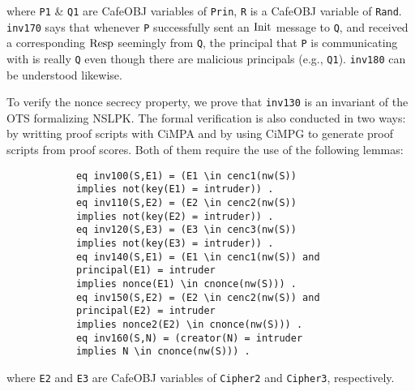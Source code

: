 \documentclass[10pt, conference, compsocconf]{IEEEtran}
\begin{document}
	\noindent
	where \verb!P1! \& \verb!Q1! are CafeOBJ variables of \verb!Prin!, \verb!R! is a CafeOBJ variable of \verb!Rand!.
	\verb!inv170! says that whenever \verb!P! successfully sent an $\rm Init$ message to \verb!Q!, and
	received a corresponding $\rm Resp$ seemingly from \verb!Q!,
	the principal that \verb!P! is communicating with is really \verb!Q! even though there are malicious principals (e.g., \verb!Q1!).
	\verb!inv180! can be understood likewise.
	
	To verify the nonce secrecy property, we prove that \verb!inv130! is an invariant of the OTS formalizing NSLPK. 
	The formal verification is also conducted in two ways: by writting proof scripts with CiMPA and by using CiMPG to generate proof scripts from proof scores.
	Both of them require the use of the following lemmas:
	
	\begin{small}
		\begin{verbatim}
			eq inv100(S,E1) = (E1 \in cenc1(nw(S)) 
			implies not(key(E1) = intruder)) .
			eq inv110(S,E2) = (E2 \in cenc2(nw(S)) 
			implies not(key(E2) = intruder)) .
			eq inv120(S,E3) = (E3 \in cenc3(nw(S)) 
			implies not(key(E3) = intruder)) .
			eq inv140(S,E1) = (E1 \in cenc1(nw(S)) and 
			principal(E1) = intruder 
			implies nonce(E1) \in cnonce(nw(S))) .
			eq inv150(S,E2) = (E2 \in cenc2(nw(S)) and 
			principal(E2) = intruder
			implies nonce2(E2) \in cnonce(nw(S))) .
			eq inv160(S,N) = (creator(N) = intruder 
			implies N \in cnonce(nw(S))) .
		\end{verbatim}
	\end{small}
	
	\noindent
	where \verb!E2! and \verb!E3! are CafeOBJ variables of \verb!Cipher2! and \verb!Cipher3!, respectively.
	
\end{document}
